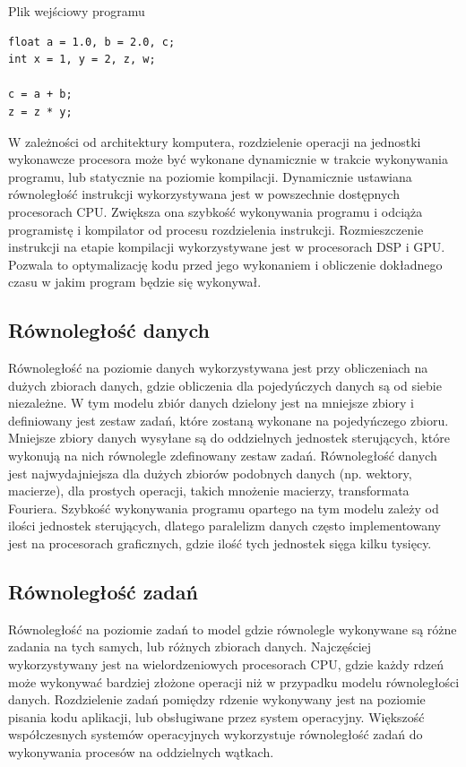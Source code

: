\begin{program}
\caption{Plik wejściowy programu}
\begin{lstlisting}
float a = 1.0, b = 2.0, c;
int x = 1, y = 2, z, w;

c = a + b;
z = z * y;
\end{lstlisting}
\end{program}

W zależności od architektury komputera, rozdzielenie operacji na jednostki wykonawcze procesora może być wykonane dynamicznie w trakcie wykonywania programu, lub statycznie na poziomie kompilacji. Dynamicznie ustawiana równoległość instrukcji wykorzystywana jest w powszechnie dostępnych procesorach CPU. Zwiększa ona szybkość wykonywania programu i odciąża programistę i kompilator od procesu rozdzielenia instrukcji. Rozmieszczenie instrukcji na etapie kompilacji wykorzystywane jest w procesorach DSP i GPU. Pozwala to optymalizację kodu przed jego wykonaniem i obliczenie dokładnego czasu w jakim program będzie się wykonywał.  

\subsection{Równoległość danych}\label{sec:datap}

Równoległość na poziomie danych wykorzystywana jest przy obliczeniach na dużych zbiorach danych, gdzie obliczenia dla pojedyńczych danych są od siebie niezależne. W tym modelu zbiór danych dzielony jest na mniejsze zbiory i definiowany jest zestaw zadań, które zostaną wykonane na pojedyńczego zbioru. Mniejsze zbiory danych wysyłane są do oddzielnych jednostek sterujących, które wykonują na nich równolegle zdefinowany zestaw zadań. Równoległość danych jest najwydajniejsza dla dużych zbiorów podobnych danych (np. wektory, macierze), dla prostych operacji, takich mnożenie macierzy, transformata Fouriera. Szybkość wykonywania programu opartego na tym modelu zależy od ilości jednostek sterujących, dlatego paralelizm danych często implementowany jest na procesorach graficznych, gdzie ilość tych jednostek sięga kilku tysięcy.

\subsection{Równoległość zadań}\label{sec:taskp}

Równoległość na poziomie zadań to model gdzie równolegle wykonywane są różne zadania na tych samych, lub różnych zbiorach danych. Najczęściej wykorzystywany jest na wielordzeniowych procesorach CPU, gdzie każdy rdzeń może wykonywać bardziej złożone operacji niż w przypadku modelu równoległości danych. Rozdzielenie zadań pomiędzy rdzenie wykonywany jest na poziomie pisania kodu aplikacji, lub obsługiwane przez system operacyjny. Większość współczesnych systemów operacyjnych wykorzystuje równoległość zadań do wykonywania procesów na oddzielnych wątkach.

